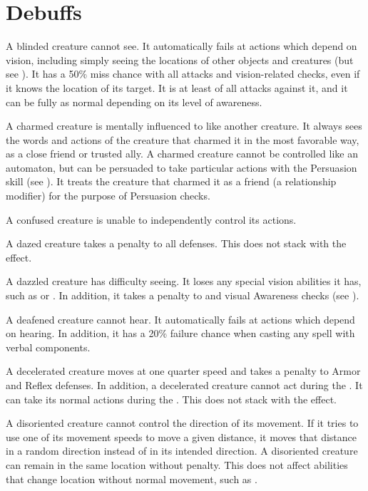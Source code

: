 \chapter{Debuffs}\label{Debuffs}

 A blinded creature cannot see.
It automatically fails at actions which depend on vision, including simply seeing the locations of other objects and creatures (but see ).
It has a 50\% miss chance with all attacks and vision-related checks, even if it knows the location of its target.
It is at least  of all attacks against it, and it can be fully  as normal depending on its level of awareness.

 A charmed creature is mentally influenced to like another creature.
It always sees the words and actions of the creature that charmed it in the most favorable way, as a close friend or trusted ally.
A charmed creature cannot be controlled like an automaton, but can be persuaded to take particular actions with the Persuasion skill (see ).
It treats the creature that charmed it as a friend (a  relationship modifier) for the purpose of Persuasion checks.

 A confused creature is unable to independently control its actions. \confusionexplanation

 A dazed creature takes a  penalty to all defenses.
This does not stack with the  effect.

 A dazzled creature has difficulty seeing.
It loses any special vision abilities it has, such as  or .
In addition, it takes a  penalty to  and visual Awareness checks (see ).

 A deafened creature cannot hear. It automatically fails at actions which depend on hearing. In addition, it has a 20\% failure chance when casting any spell with verbal components.

 A decelerated creature moves at one quarter speed and takes a  penalty to Armor and Reflex defenses.
In addition, a decelerated creature cannot act during the .
It can take its normal actions during the .
This does not stack with the  effect.

 A disoriented creature cannot control the direction of its movement.
If it tries to use one of its movement speeds to move a given distance, it moves that distance in a random direction instead of in its intended direction.
A disoriented creature can remain in the same location without penalty.
This does not affect abilities that change location without normal movement, such as .

